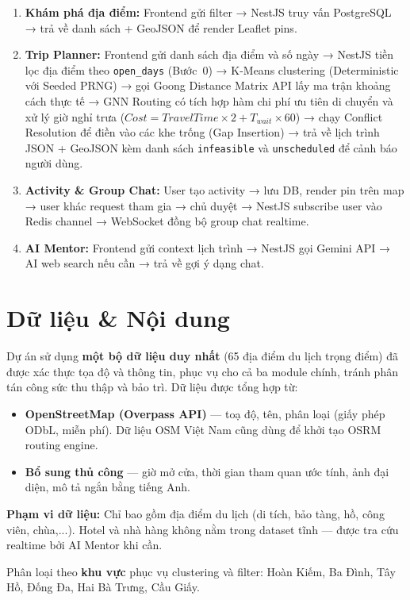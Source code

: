 \documentclass[12pt,a4paper]{article}
\begin{document}
\begin{enumerate}
  \item \textbf{Khám phá địa điểm:} Frontend gửi filter → NestJS truy vấn
        PostgreSQL → trả về danh sách + GeoJSON để render Leaflet pins.

  \item \textbf{Trip Planner:} Frontend gửi danh sách địa điểm và số ngày →
        NestJS tiền lọc địa điểm theo \texttt{open\_days} (Bước~0) → K-Means
        clustering (Deterministic với Seeded PRNG) → gọi Goong Distance Matrix API lấy ma trận khoảng cách
        thực tế → GNN Routing có tích hợp hàm chi phí ưu tiên di chuyển và xử lý giờ nghỉ trưa
        ($Cost = TravelTime \times 2 + T_{wait} \times 60$) → chạy Conflict Resolution để điền vào các khe trống (Gap Insertion) → trả về lịch trình JSON + GeoJSON
        kèm danh sách \texttt{infeasible} và \texttt{unscheduled} để cảnh báo người dùng.

  \item \textbf{Activity \& Group Chat:} User tạo activity → lưu DB, render
        pin trên map → user khác request tham gia → chủ duyệt → NestJS
        subscribe user vào Redis channel → WebSocket đồng bộ group chat
        realtime.

  \item \textbf{AI Mentor:} Frontend gửi context lịch trình → NestJS gọi
        Gemini API → AI web search nếu cần → trả về gợi ý dạng chat.
\end{enumerate}

\section{Dữ liệu \& Nội dung}

Dự án sử dụng \textbf{một bộ dữ liệu duy nhất} (65 địa điểm du lịch trọng điểm)
đã được xác thực tọa độ và thông tin, phục vụ cho cả ba module chính, tránh phân
tán công sức thu thập và bảo trì. Dữ liệu được tổng hợp từ:

\begin{itemize}
  \item \textbf{OpenStreetMap (Overpass API)} --- toạ độ, tên, phân loại
        (giấy phép ODbL, miễn phí). Dữ liệu OSM Việt Nam cũng dùng để khởi
        tạo OSRM routing engine.
  \item \textbf{Bổ sung thủ công} --- giờ mở cửa, thời gian tham quan ước
        tính, ảnh đại diện, mô tả ngắn bằng tiếng Anh.
\end{itemize}

\textbf{Phạm vi dữ liệu:} Chỉ bao gồm địa điểm du lịch (di tích, bảo tàng,
hồ, công viên, chùa,...). Hotel và nhà hàng không nằm trong dataset tĩnh ---
được tra cứu realtime bởi AI Mentor khi cần.

\medskip
Phân loại theo \textbf{khu vực} phục vụ clustering và filter:
Hoàn Kiếm, Ba Đình, Tây Hồ, Đống Đa, Hai Bà Trưng, Cầu Giấy.
\end{document}
